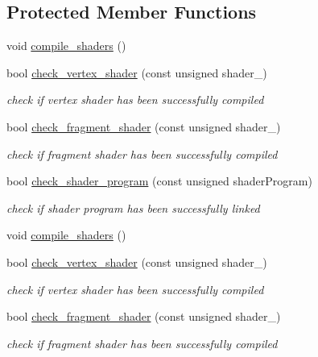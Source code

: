 \subsection*{Protected Member Functions}
\begin{DoxyCompactItemize}
\item 
void \mbox{\hyperlink{classShader_a1176d69a08aef6df3b7850104871a839}{compile\+\_\+shaders}} ()
\item 
bool \mbox{\hyperlink{classShader_a6be59304dbddc46ae641e6fe6cd02938}{check\+\_\+vertex\+\_\+shader}} (const unsigned shader\+\_\+)
\begin{DoxyCompactList}\small\item\em check if vertex shader has been successfully compiled \end{DoxyCompactList}\item 
bool \mbox{\hyperlink{classShader_af80deea033a7fb48bc162b33056bd7a0}{check\+\_\+fragment\+\_\+shader}} (const unsigned shader\+\_\+)
\begin{DoxyCompactList}\small\item\em check if fragment shader has been successfully compiled \end{DoxyCompactList}\item 
bool \mbox{\hyperlink{classShader_aed672a8004b14078f149603eeb1a3f5a}{check\+\_\+shader\+\_\+program}} (const unsigned shader\+Program)
\begin{DoxyCompactList}\small\item\em check if shader program has been successfully linked \end{DoxyCompactList}\item 
void \mbox{\hyperlink{classShader_a1176d69a08aef6df3b7850104871a839}{compile\+\_\+shaders}} ()
\item 
bool \mbox{\hyperlink{classShader_a6be59304dbddc46ae641e6fe6cd02938}{check\+\_\+vertex\+\_\+shader}} (const unsigned shader\+\_\+)
\begin{DoxyCompactList}\small\item\em check if vertex shader has been successfully compiled \end{DoxyCompactList}\item 
bool \mbox{\hyperlink{classShader_af80deea033a7fb48bc162b33056bd7a0}{check\+\_\+fragment\+\_\+shader}} (const unsigned shader\+\_\+)
\begin{DoxyCompactList}\small\item\em check if fragment shader has been successfully compiled \end{DoxyCompactList}\item 

\end{DoxyCompactItemize}
